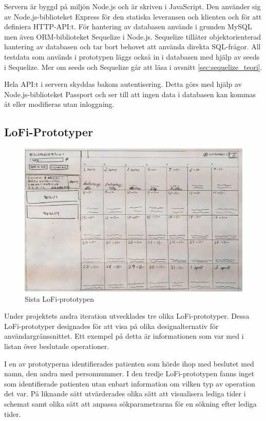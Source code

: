 Servern är byggd på miljön Node.js och är skriven i JavaScript. Den använder sig av Node.js-biblioteket Express för den statiska leveransen och klienten och för att definiera HTTP-API:t. För hantering av databasen används i grunden MySQL men även ORM-biblioteket Sequelize i Node.js. Sequelize tillåter objektorienterad hantering av databasen och tar bort behovet att använda direkta SQL-frågor. All testdata som används i prototypen läggs också in i databasen med hjälp av seeds i Sequelize. Mer om seeds och Sequelize går att läsa i avsnitt \ref{sec:sequelize_teori}.

Hela API:t i servern skyddas bakom autentisering. Detta görs med hjälp av Node.js-biblioteket Passport och ser till att ingen data i databasen kan kommas åt eller modifieras utan inloggning.

\subsection{LoFi-Prototyper}

\begin{figure}[H]
  \includegraphics[width=\linewidth]{Figures/LoFi_no2.jpg}
  \caption{Sista LoFi-prototypen}
  \label{fig:LofiPic}
\end{figure}


Under projektets andra iteration utvecklades tre olika LoFi-prototyper. Dessa
LoFi-prototyper designades för att visa på olika designalternativ för
användargränssnittet. Ett exempel på detta är informationen som var med i listan
över beslutade operationer.

I en av prototyperna identifierades patienten som hörde ihop med beslutet med namn, den andra med personnummer. I den tredje LoFi-prototypen
fanns inget som identifierade patienten utan enbart information om vilken
typ av operation det var. På liknande sätt utvärderades olika sätt att
visualisera lediga tider i schemat samt olika sätt att anpassa sökparametrarna för en sökning efter lediga tider.

